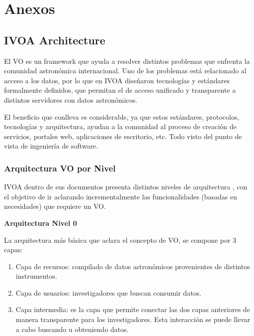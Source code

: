 \section{Anexos}
\subsection{IVOA Architecture}


El VO es un framework que ayuda a resolver distintos
problemas que enfrenta la comunidad astronómica internacional. Uno de
los problemas está relacionado al acceso a los datos, por lo que en IVOA
diseñaron tecnologías y estándares formalmente definidos, que permitan el de
acceso unificado y transparente a distintos servidores con datos astronómicos.

El beneficio que conlleva es considerable, ya que estos
estándares, protocolos, tecnologías y arquitectura, ayudan a la comunidad al
proceso de creación de servicios, portales web, aplicaciones de escritorio,
etc. Todo visto del punto de vista de ingeniería de software.

\subsubsection{Arquitectura VO por Nivel}


IVOA dentro de sus documentos presenta distintos niveles de arquitectura
\cite{ivoa_arch}, con el objetivo de ir aclarando incrementalmente las
funcionalidades (basadas en necesidades) que requiere un VO.

\textbf{Arquitectura Nivel 0} %


La arquitectura más básica que aclara el concepto de VO, se compone por 3
capas:

\begin{enumerate}
    \item Capa de recursos:
          compilado de datos astronómicos provenientes de distintos instrumentos.
    \item Capa de usuarios:
          investigadores que buscan consumir datos.
    \item Capa intermedia:
          es la capa que permite conectar las dos
          capas anteriores de manera transparente para los investigadores.
          Esta interacción se puede llevar a cabo buscando u obteniendo datos.
\end{enumerate}

